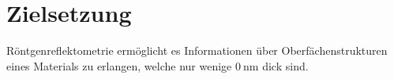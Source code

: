 \chapter{Zielsetzung}
\label{cha:zielsetzung}

Röntgenreflektometrie ermöglicht es Informationen über Oberfächenstrukturen eines Materials zu erlangen, welche nur wenige $\qty{0}{\nano\metre}$ dick
sind.
